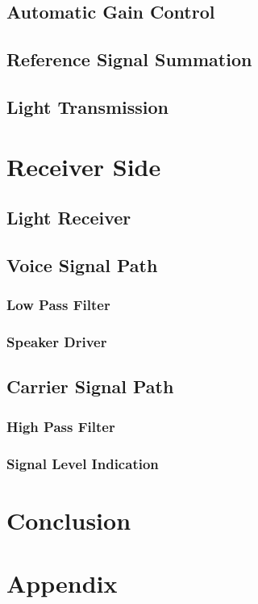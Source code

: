 \documentclass[a4paper,10pt]{IEEEtran}
\begin{document}
\subsection{Automatic Gain Control}
\subsection{Reference Signal Summation}
\subsection{Light Transmission}
\section{Receiver Side}
\subsection{Light Receiver}
\subsection{Voice Signal Path}
\subsubsection{Low Pass Filter}
\subsubsection{Speaker Driver}
\subsection{Carrier Signal Path}
\subsubsection{High Pass Filter}
\subsubsection{Signal Level Indication}


\section{Conclusion}

\section*{Appendix}
\end{document}
